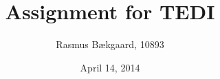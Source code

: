 





\usepackage[left=3cm,right=2cm,top=2.5cm,bottom=2cm]{geometry}

\linespread{1.5}

\title{Assignment for TEDI}
\author{Rasmus Bækgaard, 10893}
\date{April 14, 2014}